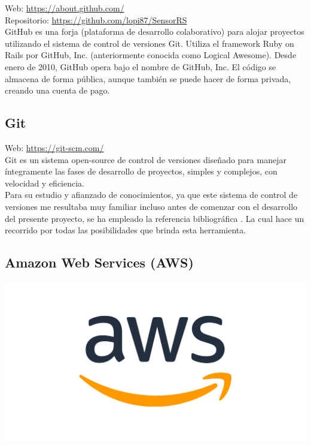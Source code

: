 Web: \url{https://about.github.com/} \cite{website:2} \\
Repositorio: \url{https://github.com/lopi87/SensorRS}\\


GitHub es una forja (plataforma de desarrollo colaborativo) para alojar proyectos utilizando el sistema de control de versiones Git. Utiliza el framework Ruby on Rails por GitHub, Inc. (anteriormente conocida como Logical Awesome). Desde enero de 2010, GitHub opera bajo el nombre de GitHub, Inc. El código se almacena de forma pública, 
aunque también se puede hacer de forma privada, creando una cuenta de pago.\\

\subsection{Git}


Web: \url{https://git-scm.com/}\\

Git es un sistema open-source de control de versiones diseñado para manejar íntegramente las fases de desarrollo de proyectos, simples y complejos, con velocidad y eficiencia.\\

Para su estudio y afianzado de conocimientos, ya que este sistema de control de versiones me resultaba muy familiar incluso antes de comenzar con el desarrollo del presente proyecto, se ha empleado 
la referencia bibliográfica \cite{book:git}. La cual hace un recorrido por todas las posibilidades que brinda esta herramienta.\\


\subsection{Amazon Web Services (AWS) }

\begin{center}\includegraphics[scale=0.25]{imagenes/aws_logo.png}\end{center}

